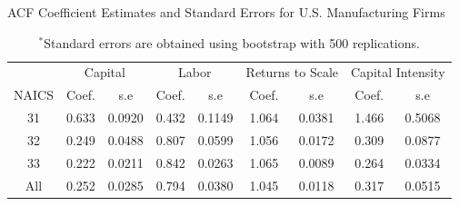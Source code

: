 \documentclass[12pt]{article}
\begin{document}
\begin{table}[H]
\centering
\caption{ACF Coefficient Estimates and Standard Errors for U.S. Manufacturing Firms}
\small
\begin{tabular}{ccccccccc}
  \hline\hline & \multicolumn{2}{c}{Capital} & \multicolumn{2}{c}{Labor} & \multicolumn{2}{c}{Returns to Scale} & \multicolumn{2}{c}{Capital Intensity}\\ \cmidrule(lr){2-3} \cmidrule(lr){4-5} \cmidrule(lr){6-7} \cmidrule(lr){8-9}NAICS & Coef. & s.e & Coef. & s.e & Coef. & s.e & Coef. & s.e \\ 
  \hline
31 & 0.633 & 0.0920 & 0.432 & 0.1149 & 1.064 & 0.0381 & 1.466 & 0.5068 \\ 
  32 & 0.249 & 0.0488 & 0.807 & 0.0599 & 1.056 & 0.0172 & 0.309 & 0.0877 \\ 
  33 & 0.222 & 0.0211 & 0.842 & 0.0263 & 1.065 & 0.0089 & 0.264 & 0.0334 \\ 
  All & 0.252 & 0.0285 & 0.794 & 0.0380 & 1.045 & 0.0118 & 0.317 & 0.0515 \\ 
   \hline
\end{tabular}
\caption*{\footnotesize $^{*}$Standard errors are obtained using bootstrap with 500 replications.}
\label{USACF}
\end{table}
\end{document}
